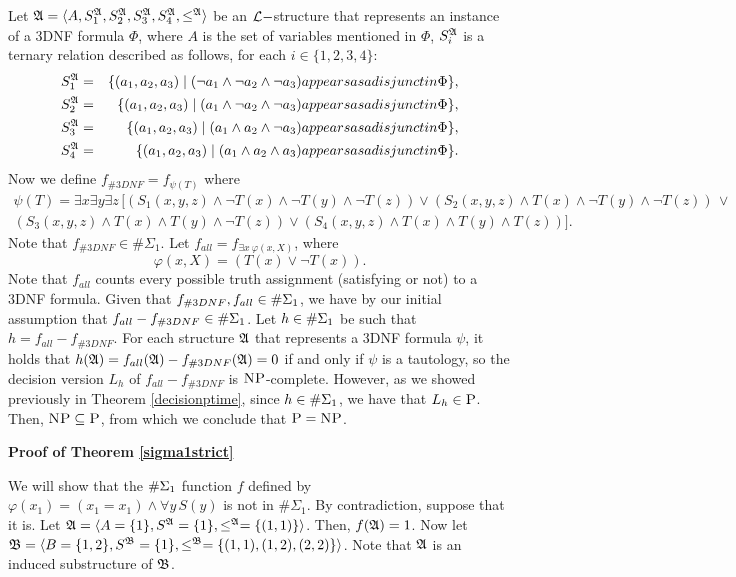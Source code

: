 Let $\mathfrak{A} = \langle A, S_1^{\mathfrak{A}}, S_2^{\mathfrak{A}}, S_3^{\mathfrak{A}}, S_4^{\mathfrak{A}}, \leq^{\mathfrak{A}} \rangle$ be an $\L-$structure that represents an instance of a 3DNF formula $\Phi$, where $A$ is the set of variables mentioned in $\Phi$, $S_i^{\mathfrak{A}}$ is a ternary relation described as follows, for each $i\in\{1,2,3,4\}$:
\begin{eqnarray*}
	S_1^{\mathfrak{A}} &=& \{(a_1,a_2,a_3)\mid (\neg a_1 \wedge \neg a_2 \wedge \neg a_3) \relax{ appears as a disjunct in }\Phi\},\\
	S_2^{\mathfrak{A}} &=& \{(a_1,a_2,a_3)\mid ( a_1 \wedge \neg a_2 \wedge \neg a_3) \relax{ appears as a disjunct in }\Phi\},\\
	S_3^{\mathfrak{A}} &=& \{(a_1,a_2,a_3)\mid ( a_1 \wedge  a_2 \wedge \neg a_3) \relax{ appears as a disjunct in }\Phi\},\\
	S_4^{\mathfrak{A}} &=& \{(a_1,a_2,a_3)\mid ( a_1 \wedge  a_2 \wedge  a_3) \relax{ appears as a disjunct in }\Phi\}.
\end{eqnarray*}
Now we define $f_{\#3DNF} = f_{\psi(T)}$ where
\begin{multline*}
\psi(T) = \exists x \exists y \exists z\, [(S_1(x,y,z) \wedge \neg T(x) \wedge \neg T(y) \wedge \neg T(z)) \vee (S_2(x,y,z) \wedge T(x) \wedge \neg T(y) \wedge \neg T(z)) \, \vee \\ (S_3(x,y,z) \wedge T(x) \wedge T(y) \wedge \neg T(z)) \vee (S_4(x,y,z) \wedge T(x) \wedge T(y) \wedge T(z))].
\end{multline*}
Note that $f_{\#3DNF} \in \#\Sigma_1$. Let $f_{all} = f_{\exists x\:\varphi(x,X)}$, where
$$
\varphi(x,X) = (T(x) \vee \neg T(x)).
$$
Note that $f_{all}$ counts every possible truth assignment (satisfying or not) to a 3DNF formula. Given that $f_{\#3DNF}, f_{all} \in \#\Sigma_{1}$, we have by our initial assumption that $f_{all}-f_{\#3DNF} \in \#\Sigma_{1}$. Let $h\in\#\Sigma_{1}$ be such that $h = f_{all}-f_{\#3DNF}$. For each structure $\mathfrak{A}$ that represents a 3DNF formula $\psi$, it holds that $h(\mathfrak{A}) = f_{all}(\mathfrak{A})-f_{\#3DNF}(\mathfrak{A}) = 0$ if and only if $\psi$ is a tautology, so the decision version $L_h$ of $f_{all}-f_{\#3DNF}$ is $\text{\sc NP}$-complete. However, as we showed previously in Theorem \ref{decisionptime}, since $h\in\#\Sigma_{1}$, we have that $L_h \in \text{\sc P}$. Then, $\text{\sc NP} \subseteq \text{\sc P}$, from which we conclude that $\text{\sc P} = \text{\sc NP}$.
	
\textbf{Proof of Theorem \ref{sigma1strict}}

We will show that the $\#\Sigma_{1}$ function $f$ defined by $\varphi(x_1) = (x_1 = x_1) \wedge \forall y \, S(y)$ is not in $\#\Sigma_1$. By contradiction, suppose that it is. Let $\mathfrak{A} = \langle A =\{1\},S^{\mathfrak{A}} = \{1\},\leq^{\mathfrak{A}}=\{(1,1)\} \rangle$. Then, $f(\mathfrak{A}) = 1$. Now let ${\frak B} = \langle B =\{1,2\},S^{\frak B} = \{1\},\leq^{\frak B}=\{(1,1),(1,2),(2,2)\} \rangle$. Note that $\mathfrak{A}$ is an induced substructure of ${\frak B}$.

